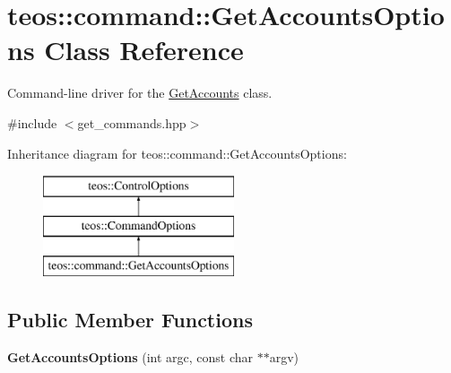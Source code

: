 \hypertarget{classteos_1_1command_1_1_get_accounts_options}{}\section{teos\+:\+:command\+:\+:Get\+Accounts\+Options Class Reference}
\label{classteos_1_1command_1_1_get_accounts_options}


Command-\/line driver for the \mbox{\hyperlink{classteos_1_1command_1_1_get_accounts}{Get\+Accounts}} class.  




{\ttfamily \#include $<$get\+\_\+commands.\+hpp$>$}

Inheritance diagram for teos\+:\+:command\+:\+:Get\+Accounts\+Options\+:\begin{figure}[H]
\begin{center}
\leavevmode
\includegraphics[height=3.000000cm]{classteos_1_1command_1_1_get_accounts_options}
\end{center}
\end{figure}
\subsection*{Public Member Functions}
\begin{DoxyCompactItemize}
\item 
\mbox{\label{classteos_1_1command_1_1_get_accounts_options_a2323a4efff47895e79f63f191a3c42d1}} 
{\bfseries Get\+Accounts\+Options} (int argc, const char $\ast$$\ast$argv)
\end{DoxyCompactItemize}
